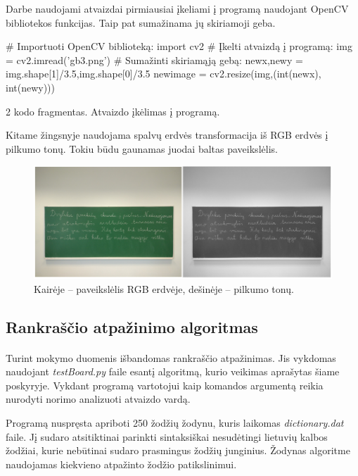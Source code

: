 \documentclass[a4paper,12pt]{article}
\begin{document}
 Darbe naudojami atvaizdai pirmiausiai įkeliami į programą naudojant OpenCV bibliotekos funkcijas. Taip pat sumažinama jų skiriamoji geba.
\begin{listing}[H]
	\begin{pythoncode}
		# Importuoti OpenCV biblioteką:
		import cv2
		# Įkelti atvaizdą į programą:
		img = cv2.imread('gb3.png')
		# Sumažinti skiriamąją gebą:
		newx,newy = img.shape[1]/3.5,img.shape[0]/3.5
		newimage = cv2.resize(img,(int(newx), int(newy)))
	\end{pythoncode}
	\begin{center}
		2 kodo fragmentas. Atvaizdo įkėlimas į programą.
	\end{center}		
\end{listing}
Kitame žingsnyje naudojama spalvų erdvės transformacija iš RGB erdvės į pilkumo tonų. Tokiu būdu gaunamas juodai baltas paveikslėlis.
		\begin{figure}[H]
			\centering
			\includegraphics[scale=0.4]{images/bgr2gray}
			\caption{Kairėje – paveikslėlis RGB erdvėje, dešinėje – pilkumo tonų.}   %
			\label{img:bgr2gray}
		\end{figure}

\subsection{Rankraščio atpažinimo algoritmas}

 \paragraph{} Turint mokymo duomenis išbandomas rankraščio atpažinimas. Jis vykdomas naudojant \textit{testBoard.py} faile esantį algoritmą, kurio veikimas aprašytas šiame poskyryje. Vykdant programą vartotojui kaip komandos argumentą reikia nurodyti norimo analizuoti atvaizdo vardą.
 
 Programą nuspręsta apriboti 250 žodžių žodynu, kuris laikomas \textit{dictionary.dat} faile. Jį sudaro atsitiktinai parinkti sintaksiškai nesudėtingi lietuvių kalbos žodžiai, kurie nebūtinai sudaro prasmingus žodžių junginius. Žodynas algoritme naudojamas kiekvieno atpažinto žodžio patikslinimui.
 
\end{document}
